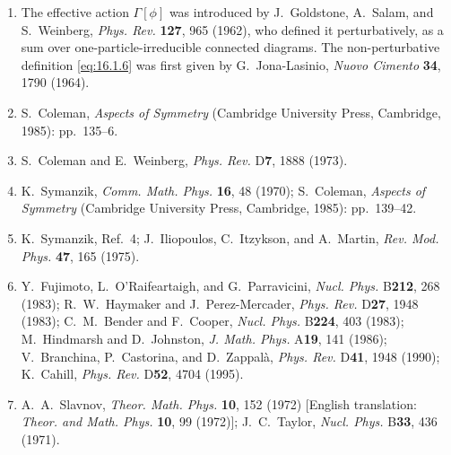 \begin{enumerate}
  \item {}\label{ch16-ref-1}
  The effective action $\Gamma[\phi]$ was introduced by J.~Goldstone, A.~Salam,
  and S.~Weinberg, \textit{Phys. Rev.} \textbf{127}, 965 (1962), who defined it
  perturbatively, as a sum over one-particle-irreducible connected diagrams. The
  non-perturbative definition \eqref{eq:16.1.6} was first given by G.~Jona-Lasinio,
  \textit{Nuovo Cimento} \textbf{34}, 1790 (1964).

  \item {}\label{ch16-ref-2}
  S.~Coleman, \textit{Aspects of Symmetry} (Cambridge University Press, Cambridge,
  1985): pp.~135--6.

  \item {}\label{ch16-ref-3}
  S.~Coleman and E.~Weinberg, \textit{Phys. Rev.} D\textbf{7}, 1888 (1973).

  \item {}\label{ch16-ref-4}
  K.~Symanzik, \textit{Comm. Math. Phys.} \textbf{16}, 48 (1970); S.~Coleman,
  \textit{Aspects of Symmetry} (Cambridge University Press, Cambridge, 1985):
  pp.~139--42.

  \item {}\label{ch16-ref-5}
  K.~Symanzik, Ref.~4; J.~Iliopoulos, C.~Itzykson, and A.~Martin,
  \textit{Rev. Mod. Phys.} \textbf{47}, 165 (1975).

  \item {}\label{ch16-ref-6}
  Y.~Fujimoto, L.~O'Raifeartaigh, and G.~Parravicini, \textit{Nucl. Phys.}
  B\textbf{212}, 268 (1983); R.~W.~Haymaker and J.~Perez-Mercader,
  \textit{Phys. Rev.} D\textbf{27}, 1948 (1983); C.~M.~Bender and F.~Cooper,
  \textit{Nucl. Phys.} B\textbf{224}, 403 (1983); M.~Hindmarsh and D.~Johnston,
  \textit{J. Math. Phys.} A\textbf{19}, 141 (1986); V.~Branchina, P.~Castorina,
  and D.~Zappal\`a, \textit{Phys. Rev.} D\textbf{41}, 1948 (1990); K.~Cahill,
  \textit{Phys. Rev.} D\textbf{52}, 4704 (1995).

  \item {}\label{ch16-ref-7}
  A.~A.~Slavnov, \textit{Theor. Math. Phys.} \textbf{10}, 152 (1972)
  [English translation: \textit{Theor. and Math. Phys.} \textbf{10}, 99 (1972)];
  J.~C.~Taylor, \textit{Nucl. Phys.} B\textbf{33}, 436 (1971).
\end{enumerate}
